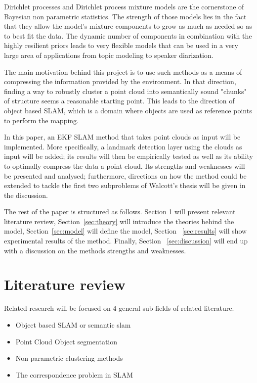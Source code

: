\documentclass[twoside,hidelinks]{article}
\begin{document}
Dirichlet processes and Dirichlet process mixture models \cite{nonParam} are the cornerstone of Bayesian non parametric statistics. The strength of those models lies in the fact that they allow the model's mixture components to grow as much as needed so as to best fit the data. The dynamic number of components in combination with the highly resilient priors leads to very flexible models that can be used in a very large area of applications from topic modeling\cite{LDA} to speaker diarization\cite{speakerDiar}. 

The main motivation behind this project is to use such methods as a means of compressing the information provided by the environment. In that direction, finding a way to robustly cluster a point cloud into semantically sound "chunks" of structure seems a reasonable starting point. This leads to the direction of object based SLAM, which is a domain where objects are used as reference points to perform the mapping.

In this paper, an EKF SLAM method that takes point clouds as input will be implemented. More specifically, a landmark detection layer using the clouds as input will be added; its results will then be empirically tested as well as its ability to optimally compress the data a point cloud. Its strengths and weaknesses will be presented and analysed; furthermore, directions on how the method could be extended to tackle the first two subproblems of Walcott's thesis will be given in the discussion.

The rest of the paper is structured as follows. Section \ref{sec:literature} will present relevant literature review, Section~\ref{sec:theory} will introduce the theories behind the model, Section~\ref{sec:model} will define the model, Section ~\ref{sec:results} will show experimental results of the method. Finally, Section ~\ref{sec:discussion} will end up with a discussion on the methods strengths and weaknesses.

 
\section{Literature review}
\label{sec:literature}

Related research will be focused on 4 general sub fields of related literature.
\begin{itemize}
	\item Object based SLAM or semantic slam
	\item Point Cloud Object segmentation
	\item Non-parametric clustering methods
	\item The correspondence problem in SLAM
\end{itemize}
\end{document}
